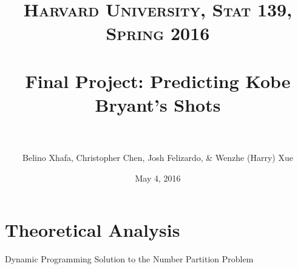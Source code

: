 \documentclass[paper=a4, fontsize=11pt]{scrartcl} %
\title{ 
\normalfont \normalsize 
\textsc{Harvard University, Stat 139, Spring 2016} \\ [25pt] %
\horrule{0.5pt} \\[0.4cm] %
\huge Final Project: Predicting Kobe Bryant's Shots \\ %
\horrule{2pt} \\[0.5cm] %
}
\author{Belino Xhafa, Christopher Chen, Josh Felizardo, \& Wenzhe (Harry) Xue}
\date{\normalsize May 4, 2016} %
\numberwithin{equation}{section} %
\numberwithin{figure}{section} %
\numberwithin{table}{section} %
\begin{document}
\maketitle %

\section{Theoretical Analysis}

\begin{mdframed}[style=MyFrame ]
\begin{center}Dynamic Programming Solution to the Number Partition Problem\end{center}
\end{mdframed}
\hspace{1cm}%
\end{document}
